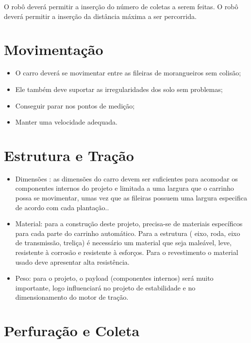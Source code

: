 O robô deverá permitir a inserção do número de coletas a serem feitas.
O robô deverá permitir a inserção da distância máxima a ser percorrida.

\section{Movimentação}

\begin{itemize}
	\item O carro deverá se movimentar entre as fileiras de morangueiros sem colisão;
	\item Ele também deve suportar as irregularidades dos solo sem problemas;
	\item Conseguir parar nos pontos de medição; 
	\item Manter uma velocidade adequada.
\end{itemize}

\section{Estrutura e Tração}

\begin{itemize}
	\item Dimensões : as dimensões do carro devem ser suficientes para acomodar os componentes internos do projeto e limitada a uma largura que o carrinho possa se movimentar, umas vez que as fileiras possuem uma largura especifica de acordo com cada plantação..
	\item Material: para a construção deste projeto, precisa-se de materiais específicos para cada parte do carrinho automático. Para a estrutura ( eixo, roda, eixo de transmissão, treliça) é necessário um material que seja maleável, leve, resistente à corrosão e resistente à esforços. Para o revestimento o material usado deve apresentar alta resistência. 
	\item Peso: para o projeto, o payload (componentes internos) será muito importante, logo  influenciará no projeto de estabilidade e no dimensionamento do motor de tração.
\end{itemize}

\section{Perfuração e Coleta}

